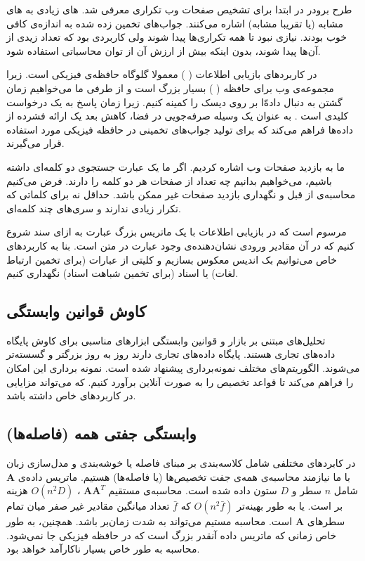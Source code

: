 طرح برودر
\cite{litez34}
در ابتدا برای تشخیص صفحات وب تکراری معرفی شد. 
های زیادی به 
های مشابه (یا تقریبا مشابه) اشاره می‌کنند. جواب‌های تخمین زده شده به اندازه‌ی کافی خوب بودند. نیازی نبود تا همه تکراری‌ها پیدا شوند ولی کاربردی بود که تعداد زیدی از آن‌ها پیدا شوند، بدون اینکه بیش از ارزش آن از توان محاسباتی استفاده شود.

در کاربردهای بازیابی اطلاعات (
)
معمولا گلوگاه حافظه‌ی فیزیکی است. زیرا مجموعه‌ی وب برای حافظه (
) بسیار بزرگ است و از طرفی ما می‌خواهیم زمان گشتن به دنبال داده‌ّا بر روی دیسک را کمینه کنیم. زیرا زمان پاسخ به یک درخواست کلیدی است
\cite{litez29}
. به عنوان یک وسیله صرفه‌جویی در فضا، کاهش بعد یک ارائه فشرده از داده‌ها فراهم می‌کند که برای تولید جواب‌های تخمینی در حافظه فیزیکی مورد استفاده قرار می‌گیرند.

ما به بازدید صفحات وب اشاره‌ کردیم. اگر ما یک عبارت جستجوی دو کلمه‌ای داشته باشیم، می‌خواهیم بدانیم چه تعداد از صفحات هر دو کلمه را دارند. فرض می‌کنیم محاسبه‌ی از قبل و نگهداری بازدید صفحات غیر ممکن باشد. حداقل نه برای کلماتی که تکرار زیادی ندارند و سری‌های چند کلمه‌ای.

مرسوم است که در بازیابی اطلاعات با یک ماتریس بزرگ عبارت به ازای سند شروع کنیم که در آن مقادیر ورودی نشان‌دهنده‌ی وجود عبارت در متن است. بنا به کاربردهای خاص می‌توانیم بک اندیس معکوس 
بسازیم و کلیتی از عبارات (برای تخمین ارتباط لغات) یا اسناد (برای تخمین شباهت اسناد) نگهداری کنیم.

\subsection{
کاوش قوانین وابستگی
}
تحلیل‌های مبتنی بر بازار و قوانین وابستگی 
\cite{litez8, litez9, litez10}
ابزارهای مناسبی برای کاوش پایگاه‌ داده‌های تجاری هستند. پایگاه داده‌های تجاری دارند روز به روز بزرگتر و گسسته‌تر می‌شوند.
\cite{litez7, litez158}
الگوریتم‌های مختلف نمونه‌برداری پیشنهاد شده است. نمونه برداری این امکان را فراهم می‌کند تا قواعد تخصیص را به صورت آنلاین برآورد کنیم. که می‌تواند مزایایی در کاربردهای خاص داشته باشد.

\subsection{
وابستگی جفتی همه (فاصله‌ها)
}
در کابردهای مختلفی شامل کلاسه‌بندی بر مبنای فاصله یا خوشه‌بندی و مدل‌سازی زبان با 
ما نیازمند محاسبه‌ی همه‌ی جفت تخصیص‌ها (یا فاصله‌ها) هستیم. ماتریس داده‌ی 
$\mathbf{A}$
شامل 
$n$
سطر و 
$D$
ستون داده شده است. محاسبه‌ی مستقیم
$\mathbf{AA}^T$
،
$O(n^2 D)$
هزینه بر است. یا به طور بهینه‌تر 
$O(n^2 \bar{f})$
که 
$\bar{f}$
تعداد میانگین مقادیر غیر صفر میان تمام سطرهای 
‌$\mathbf{A}$
است. محاسبه مستیم می‌تواند به شدت زمان‌بر باشد. همچنین، به طور خاص زمانی که ماتریس داده آنقدر بزرگ است که در حافظه فیزیکی جا نمی‌شود. محاسبه به طور خاص بسیار ناکارآمد خواهد بود.

